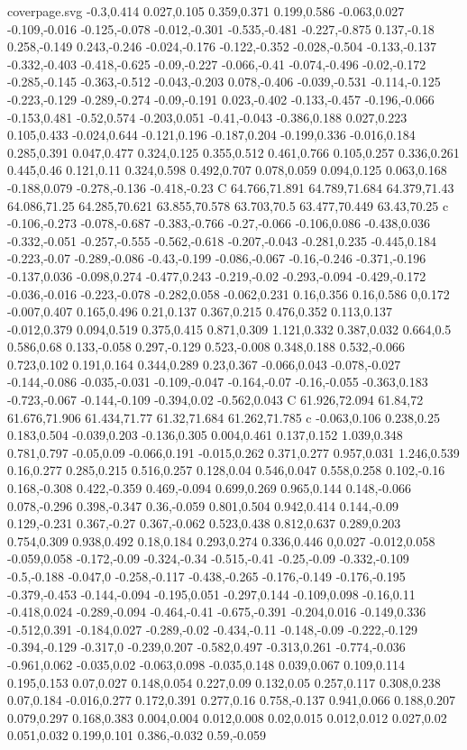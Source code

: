 \begin{filecontents}[noheader]{coverpage.svg}
-0.3,0.414 0.027,0.105 0.359,0.371 0.199,0.586 -0.063,0.027 -0.109,-0.016 -0.125,-0.078 -0.012,-0.301 -0.535,-0.481 -0.227,-0.875 0.137,-0.18 0.258,-0.149 0.243,-0.246 -0.024,-0.176 -0.122,-0.352 -0.028,-0.504 -0.133,-0.137 -0.332,-0.403 -0.418,-0.625 -0.09,-0.227 -0.066,-0.41 -0.074,-0.496 -0.02,-0.172 -0.285,-0.145 -0.363,-0.512 -0.043,-0.203 0.078,-0.406 -0.039,-0.531 -0.114,-0.125 -0.223,-0.129 -0.289,-0.274 -0.09,-0.191 0.023,-0.402 -0.133,-0.457 -0.196,-0.066 -0.153,0.481 -0.52,0.574 -0.203,0.051 -0.41,-0.043 -0.386,0.188 0.027,0.223 0.105,0.433 -0.024,0.644 -0.121,0.196 -0.187,0.204 -0.199,0.336 -0.016,0.184 0.285,0.391 0.047,0.477 0.324,0.125 0.355,0.512 0.461,0.766 0.105,0.257 0.336,0.261 0.445,0.46 0.121,0.11 0.324,0.598 0.492,0.707 0.078,0.059 0.094,0.125 0.063,0.168 -0.188,0.079 -0.278,-0.136 -0.418,-0.23 C 64.766,71.891 64.789,71.684 64.379,71.43 64.086,71.25 64.285,70.621 63.855,70.578 63.703,70.5 63.477,70.449 63.43,70.25 c -0.106,-0.273 -0.078,-0.687 -0.383,-0.766 -0.27,-0.066 -0.106,0.086 -0.438,0.036 -0.332,-0.051 -0.257,-0.555 -0.562,-0.618 -0.207,-0.043 -0.281,0.235 -0.445,0.184 -0.223,-0.07 -0.289,-0.086 -0.43,-0.199 -0.086,-0.067 -0.16,-0.246 -0.371,-0.196 -0.137,0.036 -0.098,0.274 -0.477,0.243 -0.219,-0.02 -0.293,-0.094 -0.429,-0.172 -0.036,-0.016 -0.223,-0.078 -0.282,0.058 -0.062,0.231 0.16,0.356 0.16,0.586 0,0.172 -0.007,0.407 0.165,0.496 0.21,0.137 0.367,0.215 0.476,0.352 0.113,0.137 -0.012,0.379 0.094,0.519 0.375,0.415 0.871,0.309 1.121,0.332 0.387,0.032 0.664,0.5 0.586,0.68 0.133,-0.058 0.297,-0.129 0.523,-0.008 0.348,0.188 0.532,-0.066 0.723,0.102 0.191,0.164 0.344,0.289 0.23,0.367 -0.066,0.043 -0.078,-0.027 -0.144,-0.086 -0.035,-0.031 -0.109,-0.047 -0.164,-0.07 -0.16,-0.055 -0.363,0.183 -0.723,-0.067 -0.144,-0.109 -0.394,0.02 -0.562,0.043 C 61.926,72.094 61.84,72 61.676,71.906 61.434,71.77 61.32,71.684 61.262,71.785 c -0.063,0.106 0.238,0.25 0.183,0.504 -0.039,0.203 -0.136,0.305 0.004,0.461 0.137,0.152 1.039,0.348 0.781,0.797 -0.05,0.09 -0.066,0.191 -0.015,0.262 0.371,0.277 0.957,0.031 1.246,0.539 0.16,0.277 0.285,0.215 0.516,0.257 0.128,0.04 0.546,0.047 0.558,0.258 0.102,-0.16 0.168,-0.308 0.422,-0.359 0.469,-0.094 0.699,0.269 0.965,0.144 0.148,-0.066 0.078,-0.296 0.398,-0.347 0.36,-0.059 0.801,0.504 0.942,0.414 0.144,-0.09 0.129,-0.231 0.367,-0.27 0.367,-0.062 0.523,0.438 0.812,0.637 0.289,0.203 0.754,0.309 0.938,0.492 0.18,0.184 0.293,0.274 0.336,0.446 0,0.027 -0.012,0.058 -0.059,0.058 -0.172,-0.09 -0.324,-0.34 -0.515,-0.41 -0.25,-0.09 -0.332,-0.109 -0.5,-0.188 -0.047,0 -0.258,-0.117 -0.438,-0.265 -0.176,-0.149 -0.176,-0.195 -0.379,-0.453 -0.144,-0.094 -0.195,0.051 -0.297,0.144 -0.109,0.098 -0.16,0.11 -0.418,0.024 -0.289,-0.094 -0.464,-0.41 -0.675,-0.391 -0.204,0.016 -0.149,0.336 -0.512,0.391 -0.184,0.027 -0.289,-0.02 -0.434,-0.11 -0.148,-0.09 -0.222,-0.129 -0.394,-0.129 -0.317,0 -0.239,0.207 -0.582,0.497 -0.313,0.261 -0.774,-0.036 -0.961,0.062 -0.035,0.02 -0.063,0.098 -0.035,0.148 0.039,0.067 0.109,0.114 0.195,0.153 0.07,0.027 0.148,0.054 0.227,0.09 0.132,0.05 0.257,0.117 0.308,0.238 0.07,0.184 -0.016,0.277 0.172,0.391 0.277,0.16 0.758,-0.137 0.941,0.066 0.188,0.207 0.079,0.297 0.168,0.383 0.004,0.004 0.012,0.008 0.02,0.015 0.012,0.012 0.027,0.02 0.051,0.032 0.199,0.101 0.386,-0.032 0.59,-0.059 
\end{filecontents}

